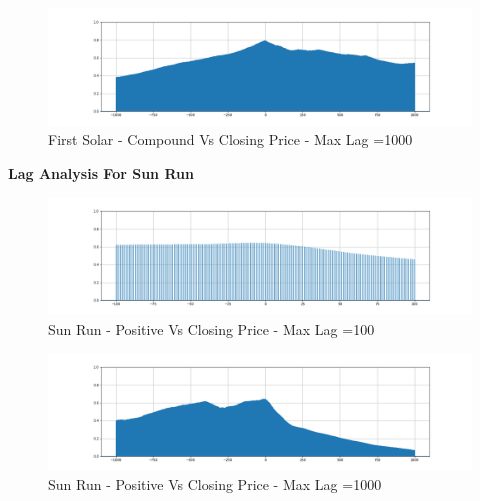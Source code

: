 \documentclass[sigconf, nonacm]{acmart}
\begin{document}
\begin{figure}[H]
  \centering
  \includegraphics[width=\linewidth]{images/fslr_1000_comp.png}
  \caption{First Solar - Compound Vs Closing Price - Max Lag =1000}
  \label{fslr_1000_comp}
\end{figure}





\textbf{Lag Analysis For Sun Run}
\newline
\begin{figure}[H]
  \centering
  \includegraphics[width=\linewidth]{images/srun_100_pos.png}
  \caption{Sun Run - Positive Vs Closing Price - Max Lag =100}
  \label{srun_100_pos}
\end{figure}

\begin{figure}[H]
  \centering
  \includegraphics[width=\linewidth]{images/srun_1000_pos.png}
  \caption{Sun Run - Positive Vs Closing Price - Max Lag =1000}
  \label{srun_1000_pos}
\end{figure}



\end{document}
